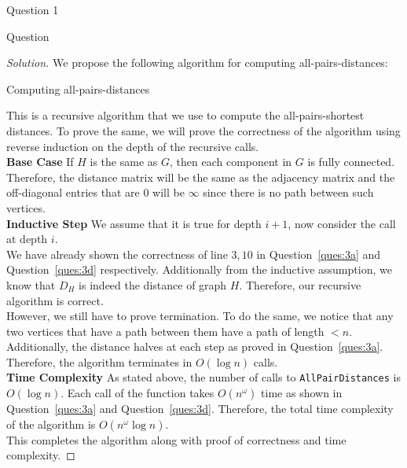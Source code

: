 \begin{solution}{Question 1}
    \begin{question}
        Question
    \end{question}
    \tcblower{}
    \begin{proof}[Solution]
      We propose the following algorithm for computing all-pairs-distances:
      \begin{algorithm}[H]
        \caption{Computing all-pairs-distances}\label{alg:all}
        \begin{algorithmic}[1]
            \EndIf{}
          \EndProcedure{}
        \end{algorithmic}
      \end{algorithm}
      This is a recursive algorithm that we use to compute the all-pairs-shortest distances. To prove the same, we will prove the correctness of the algorithm using reverse induction on the depth of the recursive calls.\\

      \textbf{Base Case} If $H$ is the same as $G$, then each component in $G$ is fully connected. Therefore, the distance matrix will be the same as the adjacency matrix and the off-diagonal entries that are $0$ will be $\infty$ since there is no path between such vertices.\\
      \textbf{Inductive Step} We assume that it is true for depth $i+1$, now consider the call at depth $i$.\\
      We have already shown the correctness of line $3, 10$ in Question~\ref{ques:3a} and Question~\ref{ques:3d} respectively. Additionally from the inductive assumption, we know that $D_H$ is indeed the distance of graph $H$. Therefore, our recursive algorithm is correct.\\

      However, we still have to prove termination. To do the same, we notice that any two vertices that have a path between them have a path of length $< n$. Additionally, the distance halves at each step as proved in Question~\ref{ques:3a}. Therefore, the algorithm terminates in $O(\log{n})$ calls.\\
      \textbf{Time Complexity} As stated above, the number of calls to \texttt{AllPairDistances} is $O(\log{n})$. Each call of the function takes $O(n^\omega)$ time as shown in Question~\ref{ques:3a} and Question~\ref{ques:3d}. Therefore, the total time complexity of the algorithm is $O(n^\omega \log{n})$.\\
      This completes the algorithm along with proof of correctness and time complexity.
    \end{proof}
\end{solution}
